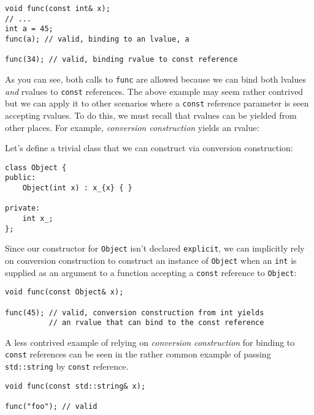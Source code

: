 		\begin{verbatim}
void func(const int& x);
// ...
int a = 45;
func(a); // valid, binding to an lvalue, a

func(34); // valid, binding rvalue to const reference
		\end{verbatim}

		As you can see, both calls to \texttt{func} are allowed because we can
		bind both lvalues \textit{and} rvalues to \texttt{const} references. The
		above example may seem rather contrived but we can apply it to other
		scenarios where a \texttt{const} reference parameter is seen accepting
		rvalues. To do this, we must recall that rvalues can be yielded from
		other places. For example, \textit{conversion construction} yields an
		rvalue: 

		Let's define a trivial class that we can construct via conversion
		construction:
	
		\begin{verbatim}
class Object {
public:
	Object(int x) : x_{x} { }

private:
	int x_;
};
		\end{verbatim}

		Since our constructor for \texttt{Object} isn't declared
		\texttt{explicit}, we can implicitly rely on conversion construction to
		construct an instance of \texttt{Object} when an \texttt{int} is
		supplied as an argument to a function accepting a \texttt{const}
		reference to \texttt{Object}:

		\begin{verbatim}
void func(const Object& x);

func(45); // valid, conversion construction from int yields
          // an rvalue that can bind to the const reference
		\end{verbatim}

		A less contrived example of relying on \textit{conversion construction}
		for binding to \texttt{const} references can be seen in the rather
		common example of passing \texttt{std::string} by \texttt{const}
		reference.

		\begin{verbatim}
void func(const std::string& x);

func("foo"); // valid 
		\end{verbatim}

